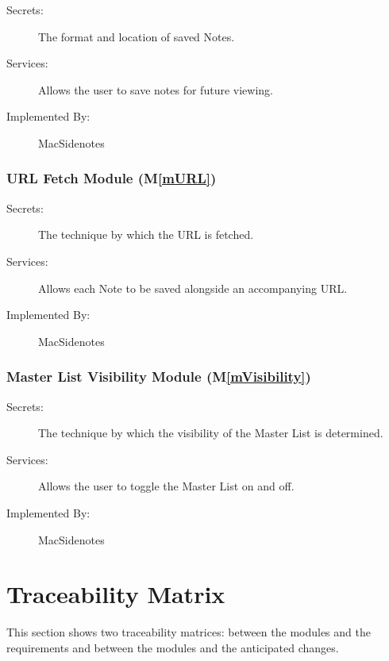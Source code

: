 \documentclass[12pt, titlepage]{article}
\newcommand{\mref}[1]{M\ref{#1}}
\begin{document}
\begin{description}
	\item[Secrets:]The format and location of saved Notes.
	\item[Services:]Allows the user to save notes for future viewing.
	\item[Implemented By:] MacSidenotes
\end{description}

\subsubsection{URL Fetch Module (\mref{mURL})}

\begin{description}
	\item[Secrets:]The technique by which the URL is fetched.
	\item[Services:]Allows each Note to be saved alongside an accompanying URL.
	\item[Implemented By:] MacSidenotes
\end{description}

\subsubsection{Master List Visibility Module (\mref{mVisibility})}

\begin{description}
	\item[Secrets:]The technique by which the visibility of the Master List is 
	determined.
	\item[Services:]Allows the user to toggle the Master List on and off.
	\item[Implemented By:] MacSidenotes
\end{description}

\section{Traceability Matrix} \label{SecTM}

This section shows two traceability matrices: between the modules and the
requirements and between the modules and the anticipated changes.
\end{document}
